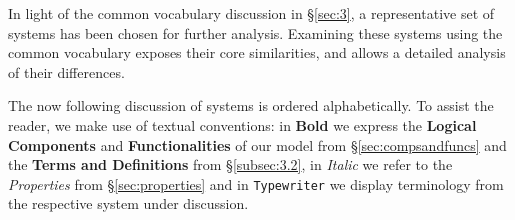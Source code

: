 \documentclass{sig-alternate}
\begin{document}
\newcommand{\vocab}[1]{\textbf{#1}\xspace}
\newcommand{\prop}[1]{\textit{#1}\xspace}
\newcommand{\impterm}[1]{\texttt{#1}\xspace}

In light of the common vocabulary discussion in \S\ref{sec:3}, a
representative set of \pilot systems has been chosen for further analysis.
Examining these \pilot systems using the common vocabulary exposes their core
similarities, and allows a detailed analysis of their differences.

The now following discussion of \pilot systems is ordered alphabetically.
To assist the reader, we make use of textual conventions: in \vocab{Bold} we
express the \vocab{Logical Components} and \vocab{Functionalities} of our model
from \S\ref{sec:compsandfuncs} and the \vocab{Terms and Definitions} from
\S\ref{subsec:3.2}, in \prop{Italic} we refer to the \prop{Properties} from
\S\ref{sec:properties} and in \impterm{Typewriter} we display terminology from
the respective \pilot system under discussion.

\end{document}

